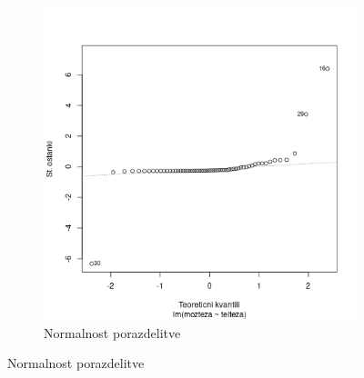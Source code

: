 \begin{figure}[h]
\begin{subfigure}[t]{0.49\textwidth}
        \includegraphics[width=\textwidth]{res/normalnost-porazdelitve.png}
        \caption{Normalnost porazdelitve}
        \label{img:normalnost-porazdelitve}
    \end{subfigure}


\end{figure}
